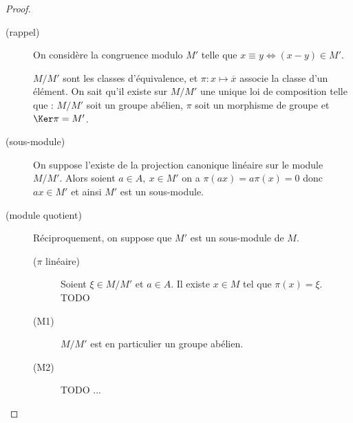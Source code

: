 \begin{proof} \
\begin{description}\item[(rappel)] On considère la congruence modulo $M'$ telle
que $x\equiv y \Leftrightarrow (x-y)\in M'$.

$M/M'$ sont les classes d'équivalence, et $\pi : x\mapsto \overline{x}$ associe
la classe d'un élément. On sait qu'il existe sur $M/M'$ une unique loi de
composition telle que : $M/M'$ soit un groupe abélien, $\pi$ soit un morphisme
de groupe et $\Ker \pi = M'$.

\item[(sous-module)] On suppose l'existe de la
projection canonique linéaire sur le module $M/M'$. Alors soient $a\in A,\ x\in
M'$ on a $\pi(ax) = a\pi(x) = 0$ donc $ax\in M'$ et ainsi $M'$ est un
sous-module. 

\item[(module quotient)] Réciproquement, on suppose que $M'$ est un sous-module
de $M$.
\begin{description}
 \item [($\pi$ linéaire)] Soient $\xi \in M/M'$ et $a\in A$. Il existe $x\in M$
tel que $\pi(x) = \xi$.  TODO
 \item [(M1)] $M/M'$ est en particulier un groupe abélien.
 \item [(M2)] TODO ...
\end{description}
\end{description}
\end{proof}

